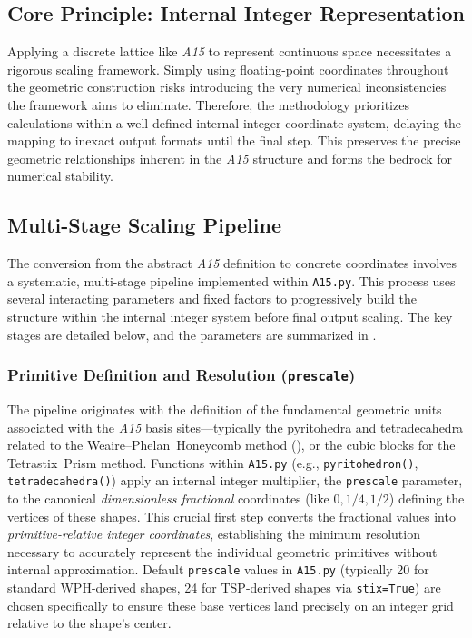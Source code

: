\documentclass[10pt]{article}
\def\AAAB{\textit{A15}}
\def\WP{Weaire--Phelan}
\def\WPH{\WP{}~Honeycomb}
\def\TSP{Tetrastix~Prism}
\begin{document}
\subsection{Core Principle: Internal Integer Representation}\label{subsec-scaling-framework}

Applying a discrete lattice like \AAAB{} to represent continuous space necessitates a rigorous scaling framework. Simply using floating-point coordinates throughout the geometric construction risks introducing the very numerical inconsistencies the framework aims to eliminate. Therefore, the methodology prioritizes calculations within a well-defined internal integer coordinate system, delaying the mapping to inexact output formats until the final step. This preserves the precise geometric relationships inherent in the \AAAB{} structure and forms the bedrock for numerical stability.

\subsection{Multi-Stage Scaling Pipeline}\label{subsec-scaling-pipeline}

The conversion from the abstract \AAAB{} definition to concrete coordinates involves a systematic, multi-stage pipeline implemented within \texttt{A15.py}. This process uses several interacting parameters and fixed factors to progressively build the structure within the internal integer system before final output scaling. The key stages are detailed below, and the parameters are summarized in .

\subsubsection{Primitive Definition and Resolution (\texttt{prescale})}\label{subsubsec-scaling-prescale}
The pipeline originates with the definition of the fundamental geometric units associated with the \AAAB{} basis sites—typically the pyritohedra and tetradecahedra related to the \WPH{} method (), or the cubic blocks for the \TSP{} method. Functions within \texttt{A15.py} (e.g., \texttt{pyritohedron()}, \texttt{tetradecahedra()}) apply an internal integer multiplier, the \texttt{prescale} parameter, to the canonical \emph{dimensionless fractional} coordinates (like $0, 1/4, 1/2$) defining the vertices of these shapes. This crucial first step converts the fractional values into \emph{primitive-relative integer coordinates}, establishing the minimum resolution necessary to accurately represent the individual geometric primitives without internal approximation. Default \texttt{prescale} values in \texttt{A15.py} (typically \num{20} for standard WPH-derived shapes, \num{24} for TSP-derived shapes via \texttt{stix=True}) are chosen specifically to ensure these base vertices land precisely on an integer grid relative to the shape's center.
\end{document}
